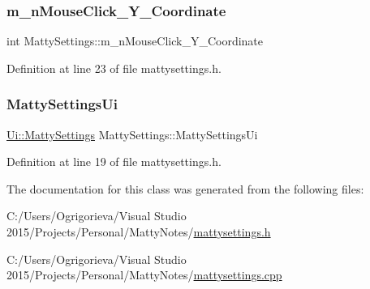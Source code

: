 \subsubsection{\texorpdfstring{m\+\_\+n\+Mouse\+Click\+\_\+\+Y\+\_\+\+Coordinate}{m\_nMouseClick\_Y\_Coordinate}}
{\footnotesize\ttfamily int Matty\+Settings\+::m\+\_\+n\+Mouse\+Click\+\_\+\+Y\+\_\+\+Coordinate\hspace{0.3cm}{\ttfamily [private]}}



Definition at line 23 of file mattysettings.\+h.

\hypertarget{classMattySettings_a6974b17b34c30385f6b503f40b460ea1}{}\label{classMattySettings_a6974b17b34c30385f6b503f40b460ea1} 
\subsubsection{\texorpdfstring{Matty\+Settings\+Ui}{MattySettingsUi}}
{\footnotesize\ttfamily \hyperlink{classUi_1_1MattySettings}{Ui\+::\+Matty\+Settings} Matty\+Settings\+::\+Matty\+Settings\+Ui\hspace{0.3cm}{\ttfamily [private]}}



Definition at line 19 of file mattysettings.\+h.



The documentation for this class was generated from the following files\+:\begin{DoxyCompactItemize}
\item 
C\+:/\+Users/\+Ogrigorieva/\+Visual Studio 2015/\+Projects/\+Personal/\+Matty\+Notes/\hyperlink{mattysettings_8h}{mattysettings.\+h}\item 
C\+:/\+Users/\+Ogrigorieva/\+Visual Studio 2015/\+Projects/\+Personal/\+Matty\+Notes/\hyperlink{mattysettings_8cpp}{mattysettings.\+cpp}\end{DoxyCompactItemize}
